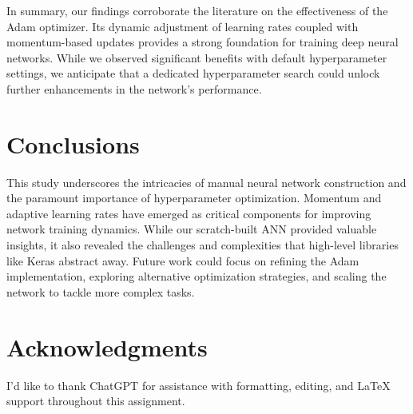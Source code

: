 \documentclass[letterpaper]{article}
\begin{document}
In summary, our findings corroborate the literature on the effectiveness of the Adam optimizer. Its dynamic adjustment of learning rates coupled with momentum-based updates provides a strong foundation for training deep neural networks. While we observed significant benefits with default hyperparameter settings, we anticipate that a dedicated hyperparameter search could unlock further enhancements in the network's performance.

\section{Conclusions}
\label{sec:conclusions}
This study underscores the intricacies of manual neural network construction and the paramount importance of hyperparameter optimization. Momentum and adaptive learning rates have emerged as critical components for improving network training dynamics. While our scratch-built ANN provided valuable insights, it also revealed the challenges and complexities that high-level libraries like Keras abstract away. Future work could focus on refining the Adam implementation, exploring alternative optimization strategies, and scaling the network to tackle more complex tasks.

\section*{Acknowledgments}
I'd like to thank ChatGPT \cite{ChatGPT2023} for assistance with formatting, editing, and LaTeX support throughout this assignment.


\end{document}
